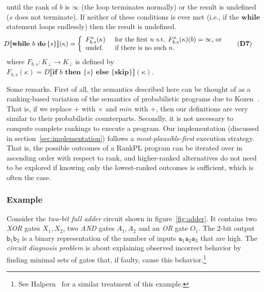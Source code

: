 \documentclass{llncs}
\newcommand{\dn}[1]{D\llbracket #1 \rrbracket}
\begin{document}
		until the rank of $b$ is $\infty$ (the loop terminates normally) or the result is undefined ($s$ does not terminate).
	If neither of these conditions is ever met (i.e., if the $\textbf{while}$ statement loops endlessly) then the result is undefined.
\begin{align}
\hspace{-5pt}\dn{\textbf{while }b\textbf{ do }\hspace{-2pt}\{ s \}}(\kappa) &=
		\left\{
			\begin{array}{ll}
				F_{b,s}^{n}(\kappa)	\hspace{4pt}	& \mbox{for the first }n\mbox{ s.t. }F_{b,s}^{n}(\kappa)(b) = \infty \mbox{, or }\\
				\mbox{undef.}		& \mbox{if there is no such }n.
			\end{array}\hspace{-5pt}\tag{\textbf{D7}}
		\right.
\end{align}
where $F_{b,s}: K_{\bot} \rightarrow K_{\bot}$ is defined by $F_{b,s}(\kappa) = \dn{\textbf{if }b\textbf{ then }\{ s \}\textbf{ else } \{ \textbf{skip} \}}(\kappa)$.

Some remarks.
First of all, the semantics described here can be thought of as a ranking-based variation of the 
	semantics of probabilistic programs due to Kozen~\cite{DBLP:journals/jcss/Kozen81}.
That is, if we replace $+$ with $\times$ and $min$ with $+$, then our definitions are very similar to their probabilistic counterparts.
Secondly, it is not necessary to compute complete rankings to execute a program.
Our implementation (discussed in section~\ref{sec:implementation}) follows a \emph{most-plausible-first} execution strategy.
That is, the possible outcomes of a RankPL program can be iterated over in ascending order with respect to rank,
	and higher-ranked alternatives do not need to be explored if knowing only the lowest-ranked outcomes is sufficient, 
	which is often the case.

\subsubsection{Example}

Consider the \emph{two-bit full adder} circuit shown in figure~\ref{fig:adder}.
It contains two \emph{XOR} gates $X_1, X_2$, two \emph{AND} gates $A_1, A_2$ and an \emph{OR} gate $O_1$.
The 2-bit output $\texttt{b}_1\texttt{b}_2$ is a binary representation of the number of inputs $\texttt{a}_1\texttt{a}_2\texttt{a}_3$ that are high.
The \emph{circuit diagnosis problem} is about explaining observed incorrect behavior by finding minimal sets of gates that, if faulty, cause this behavior.\footnote{See Halpern~\cite[Chapter~9]{DBLP:books/daglib/0014219} for a similar treatment of this example.}
\end{document}
